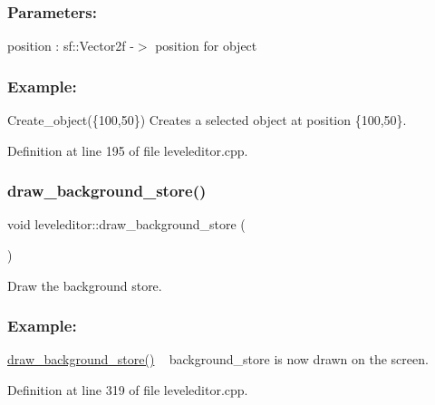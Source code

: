 \subsubsection*{Parameters\+: }

position \+: sf\+::\+Vector2f -\/$>$ position for object

\subsubsection*{Example\+: }

Create\+\_\+object(\{100,50\}) Creates a selected object at position \{100,50\}. 

Definition at line 195 of file leveleditor.\+cpp.

\mbox{\label{classleveleditor_afa6c25fa02db7ad3d904d6bb91b79643}} 
\subsubsection{\texorpdfstring{draw\+\_\+background\+\_\+store()}{draw\_background\_store()}}
{\footnotesize\ttfamily void leveleditor\+::draw\+\_\+background\+\_\+store (\begin{DoxyParamCaption}{ }\end{DoxyParamCaption})}



Draw the background store. 

\subsubsection*{Example\+: }

\hyperlink{classleveleditor_afa6c25fa02db7ad3d904d6bb91b79643}{draw\+\_\+background\+\_\+store()} ~\newline
background\+\_\+store is now drawn on the screen. ~\newline


Definition at line 319 of file leveleditor.\+cpp.

